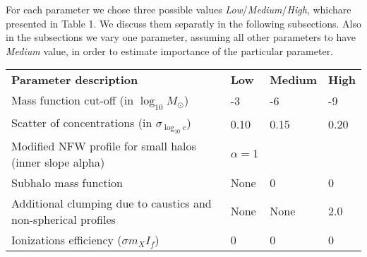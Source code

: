 For each parameter we chose three possible values \textit{Low}/\textit{Medium}/\textit{High}, whichare presented in Table 1. We discuss them separatly in the following subsections. Also in the subsections we vary one parameter, assuming all other parameters to have \textit{Medium} value, in order to estimate importance of the particular parameter.

\begin{table}
    \begin{tabular}{llll}
    \textbf{Parameter description}                                    & \textbf{Low} & \textbf{Medium} & \textbf{High} \hline \hline \\
    Mass function cut-off (in $\log_{10}M_\odot$)        & -3 & -6 & -9 \\
    Scatter of concentrations (in $\sigma_{\log_{10}c}$)              & 0.10 & 0.15 & 0.20 \\
    Modified NFW profile for small halos (inner slope alpha) & $\alpha=1$ & \cite{Ishiyama_2014} &  \cite{Ishiyama_2014} \\
    Subhalo mass function & None & 0 & 0 \\
    Additional clumping due to caustics and non-spherical profiles & None & None & 2.0
\\    
    Ionizations efficiency ($\sigma m_X I_f$) & 0 & 0 & 0
\\    \end{tabular}
\end{table}